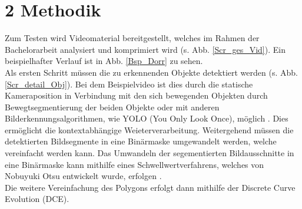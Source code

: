 \documentclass[a4paper,11pt,pdftex, parskip]{scrreprt}
\begin{document}
\section*{2 Methodik}{
Zum Testen wird Videomaterial bereitgestellt, welches im Rahmen der Bachelorarbeit analysiert und komprimiert wird (s. Abb. \ref{Scr_ges_Vid}). Ein beispielhafter Verlauf ist in Abb. \ref{Bsp_Dorr} zu sehen. \\
Als ersten Schritt müssen die zu erkennenden Objekte detektiert werden (s. Abb. \ref{Scr_detail_Obj}). Bei dem Beispielvideo ist dies durch die statische Kameraposition in Verbindung mit den sich bewegenden Objekten durch Bewegtsegmentierung der beiden Objekte oder mit anderen Bilderkennungsalgorithmen, wie YOLO (You Only Look Once), möglich . Dies ermöglicht die kontextabhängige Weieterverarbeitung.\newline
Weitergehend müssen die detektierten Bildsegmente in eine Binärmaske umgewandelt werden, welche vereinfacht werden kann. Das Umwandeln der segementierten Bildausschnitte in eine Binärmaske kann mithilfe eines Schwellwertverfahrens, welches von Nobuyuki Otsu entwickelt wurde, erfolgen \citep{Otsu1979}. \\
Die weitere Vereinfachung des Polygons erfolgt dann mithilfe der Discrete Curve Evolution (DCE).
%     
    

}
\end{document}
